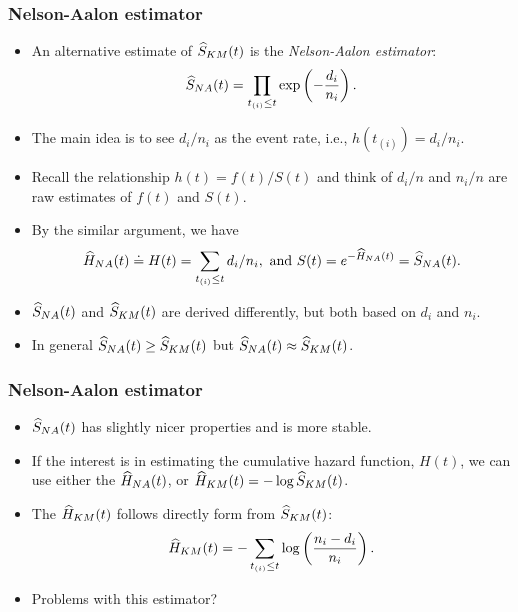 \documentclass[10pt]{beamer}\usepackage[]{graphicx}\usepackage[]{color}
\newcommand{\empr}[1]{{\emph{\color{red}#1}}}
\newcommand{\Skm}{\widehat{S}_{\scriptsize{KM}}}
\newcommand{\Sna}{\widehat{S}_{\scriptsize{NA}}}
\newcommand{\Hkm}{\widehat{H}_{\scriptsize{KM}}}
\newcommand{\Hna}{\widehat{H}_{\scriptsize{NA}}}
\begin{document}
\begin{frame}
  \frametitle{Nelson-Aalon estimator}
  \begin{itemize}
  \item An alternative estimate of $\Skm(t)$ is the \empr{Nelson-Aalon estimator}:
    \begin{equation*}
      \Sna(t) = \prod_{t_{(i)} \le t} \exp\left(-\frac{d_i}{n_i}\right).
    \end{equation*}
  \item The main idea is to see $d_i/n_i$ as the event rate, i.e., $h(t_{(i)}) = d_i/n_i$.
  \item Recall the relationship $h(t) = f(t) / S(t)$ and think of $d_i/n$ and $n_i/n$ 
    are raw estimates of $f(t)$ and $S(t)$.
  \item By the similar argument, we have
    $$\Hna(t) \doteq H(t) = \sum_{t_{(i)} \le t} d_i/n_i, \mbox{ and } S(t) = e^{-\Hna(t)} = \Sna(t).$$
  \item $\Sna(t)$ and $\Skm(t)$ are derived differently, but both based on $d_i$ and $n_i$.
  \item In general $\Sna(t)\ge\Skm(t)$ but $\Sna(t)\approx\Skm(t)$.
  \end{itemize}
\end{frame}

\begin{frame}[fragile]
  \frametitle{Nelson-Aalon estimator}
  \begin{itemize}
  \item $\Sna(t)$ has slightly nicer properties and is more stable.
  \item If the interest is in estimating the cumulative hazard function, $H(t)$, 
    we can use either the $\Hna(t)$, or $\Hkm(t) = -\log\Skm(t)$.
  \item The $\Hkm(t)$ follows directly form from $\Skm(t)$:
    \begin{equation*}
      \Hkm(t) = - \sum_{t_{(i)}\le t}\log\left(\frac{n_i - d_i}{n_i}\right).
    \end{equation*}
  \item Problems with this estimator? 
  \end{itemize}
\end{frame}    
    
\end{document}
